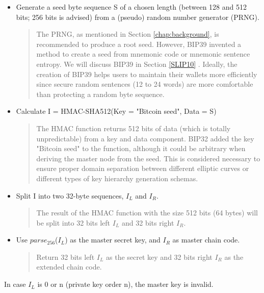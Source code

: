 \begin{itemize}
    \item Generate a seed byte sequence S of a chosen length (between 128 and 512 bits; 256 bits is advised) from a (pseudo) random number generator (PRNG).
    
    \begin{quote}
        The PRNG, as mentioned in Section \ref{chap:background}, is recommended to produce a root seed. However, BIP39 \cite{github/bip0039} invented a method to create a seed from mnemonic code or mnemonic sentence entropy. We will discuss BIP39 in Section \ref{SLIP10} . Ideally, the creation of BIP39 helps users to maintain their wallets more efficiently since secure random sentences (12 to 24 words) are more comfortable than protecting a random byte sequence.
    \end{quote}
    
    \item Calculate I = HMAC-SHA512(Key = "Bitcoin seed", Data = S)
    
        
    \begin{quote}
        The HMAC function returns 512 bits of data (which is totally unpredictable) from a key and data component. BIP32 added the key "Bitcoin seed" to the function, although it could be arbitrary when deriving the master node from the seed. This is considered necessary to ensure proper domain separation between different elliptic curves or different types of key hierarchy generation schemas.    
    \end{quote}

    \item Split I into two 32-byte sequences, $I_L$ and $I_R$.
        
    \begin{quote}
        The result of the HMAC function with the size 512 bits (64 bytes) will be split into 32 bits left  $I_L$ and 32 bits right $I_R$.
    \end{quote}
    \item Use $parse_{256}$($I_L$) as the master secret key, and $I_R$ as master chain code.

    \begin{quote}
        Return 32 bits left $I_L$ as the secret key and 32 bits right $I_R$ as the extended chain code.
    \end{quote}

\end{itemize}
In case $I_L$ is 0 or  n (private key  order n), the master key is invalid. 

